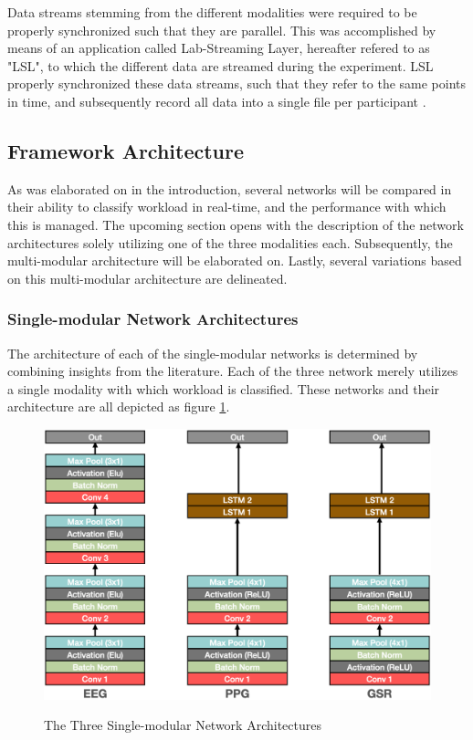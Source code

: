\documentclass[12pt]{article}
\begin{document}
Data streams stemming from the different modalities were required to be properly synchronized such that they are parallel. This was accomplished by means of an application called Lab-Streaming Layer, hereafter refered to as "LSL", to which the different data are streamed during the experiment. LSL properly synchronized these data streams, such that they refer to the same points in time, and subsequently record all data into a single file per participant \cite{kothe2018lab}.

\subsection{Framework Architecture}
As was elaborated on in the introduction, several networks will be compared in their ability to classify workload in real-time, and the performance with which this is managed. The upcoming section opens with the description of the network architectures solely utilizing one of the three modalities each. Subsequently, the multi-modular architecture will be elaborated on. Lastly, several variations based on this multi-modular architecture are delineated. 

\subsubsection{Single-modular Network Architectures}
The architecture of each of the single-modular networks is determined by combining insights from the literature. Each of the three network merely utilizes a single modality with which workload is classified. These networks and their architecture are all depicted as figure \ref{fig:singlearchitecture}.

\begin{figure}
\caption{The Three Single-modular Network Architectures}
\bigskip
\includegraphics[scale=0.725]{single_model_architecture}
\label{fig:singlearchitecture}
\end{figure}
\end{document}
